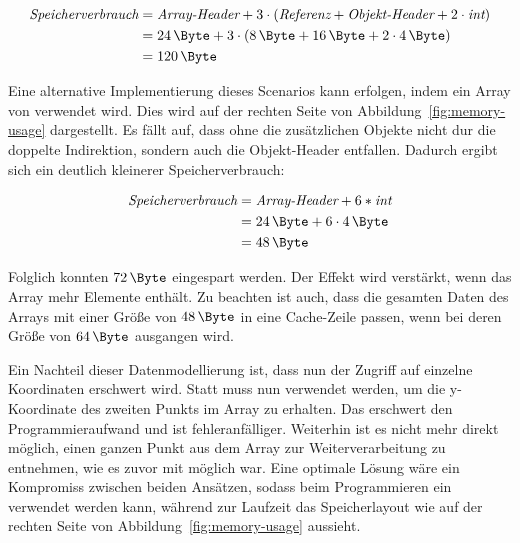 \begin{equation}
    \begin{split}
        \textit{Speicherverbrauch} & = \textit{Array-Header} + 3 \cdot (\textit{Referenz} + \textit{Objekt-Header} + 2 \cdot \textit{int}) \\
        & = \SI{24}{\Byte} + 3 \cdot (\SI{8}{\Byte} + \SI{16}{\Byte} + 2 \cdot \SI{4}{\Byte}) \\
        & = \SI{120}{\Byte}\label{eq:memory-usage-current} \\
    \end{split}
\end{equation}

Eine alternative Implementierung dieses Scenarios kann erfolgen, indem ein Array von  verwendet wird.
Dies wird auf der rechten Seite von Abbildung~\ref{fig:memory-usage} dargestellt.
Es fällt auf, dass ohne die zusätzlichen Objekte nicht dur die doppelte Indirektion, sondern auch die Objekt-Header entfallen.
Dadurch ergibt sich ein deutlich kleinerer Speicherverbrauch:

\begin{equation}
    \begin{split}
        \textit{Speicherverbrauch} & = \textit{Array-Header} + 6 * \textit{int} \\
        & = \SI{24}{\Byte} + 6 \cdot \SI{4}{\Byte} \\
        & = \SI{48}{\Byte}\label{eq:memory-usage-flat}
    \end{split}
\end{equation}

Folglich konnten $\SI{72}{\Byte}$ eingespart werden.
Der Effekt wird verstärkt, wenn das Array mehr Elemente enthält.
Zu beachten ist auch, dass die gesamten Daten des Arrays mit einer Größe von $\SI{48}{\Byte}$ in eine Cache-Zeile passen, wenn bei deren Größe von $\SI{64}{\Byte}$ ausgangen wird.

Ein Nachteil dieser Datenmodellierung ist, dass nun der Zugriff auf einzelne Koordinaten erschwert wird.
Statt  muss nun  verwendet werden, um die y-Koordinate des zweiten Punkts im Array zu erhalten.
Das erschwert den Programmieraufwand und ist fehleranfälliger.
Weiterhin ist es nicht mehr direkt möglich, einen ganzen Punkt aus dem Array zur Weiterverarbeitung zu entnehmen, wie es zuvor mit  möglich war.
Eine optimale Lösung wäre ein Kompromiss zwischen beiden Ansätzen, sodass beim Programmieren ein  verwendet werden kann, während zur Laufzeit das Speicherlayout wie auf der rechten Seite von Abbildung~\ref{fig:memory-usage} aussieht.

